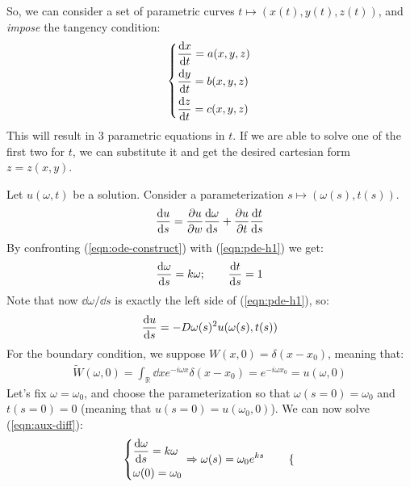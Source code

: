 \documentclass[../template.tex]{subfiles}
\begin{document}
\begin{exo}
\begin{expl}
        So, we can consider a set of parametric curves $t \mapsto (x(t), y(t), z(t))$, and \textit{impose} the tangency condition:
        \begin{align*}
            \begin{dcases}
                \dv{x}{t} = a(x,y,z)\\
                \dv{y}{t} = b(x,y,z)\\
                \dv{z}{t} = c(x,y,z)
            \end{dcases}
        \end{align*} 
        This will result in $3$ parametric equations in $t$. If we are able to solve one of the first two for $t$, we can substitute it and get the desired cartesian form $z=z(x,y)$.
    \end{expl}
    Let $u(\omega,t)$ be a solution. Consider a parameterization $s \mapsto (\omega(s),t(s))$.
    \begin{align} \label{eqn:ode-construct}
        \dv{u}{s} (\omega(s), t(s)) = \pdv{u}{w} \dv{\omega}{s} + \pdv{u}{t}\dv{t}{s}
    \end{align}
    By confronting (\ref{eqn:ode-construct}) with (\ref{eqn:pde-h1}) we get:
    \begin{align}
        \dv{\omega}{s} = k \omega; \qquad \dv{t}{s} = 1 \label{eqn:aux-diff}
    \end{align}
    Note that now $\dd{\omega}/\dd{s}$ is exactly the left side of (\ref{eqn:pde-h1}), so:
    \begin{align} \label{eqn:du}
        \dv{u}{s} (\omega(s), t(s)) = -D \omega(s)^2 u( \omega(s),t(s))
    \end{align}
    For the boundary condition, we suppose $W(x,0) = \delta(x-x_0)$, meaning that:
    \begin{align*}
        \tilde{W}(\omega,0) = \int_{\mathbb{R}} \dd{x} e^{-i \omega x} \delta(x-x_0) = e^{-i \omega x_0} = u(\omega, 0)
    \end{align*}
    Let's fix $\omega = \omega_0$, and choose the parameterization so that $\omega(s=0) = \omega_0$ and $t(s=0)=0$ (meaning that $u(s=0) = u(\omega_0,0)$). We can now solve (\ref{eqn:aux-diff}):
    \begin{align}
        \begin{dcases}
            \dv{\omega}{s} = k \omega\\
            \omega(0) = \omega_0
        \end{dcases} \Rightarrow \omega(s) = \omega_0 e^{ks} \qquad \begin{dcases}

\end{dcases}
\end{align}
\end{exo}
\end{document}
